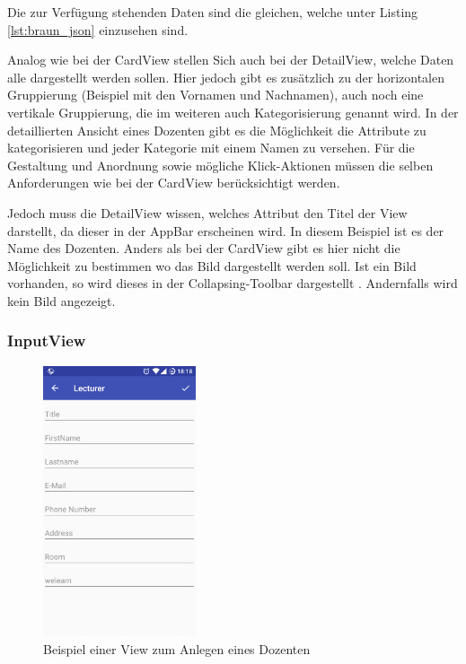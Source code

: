 Die zur Verfügung  stehenden Daten sind die gleichen, welche unter Listing \ref{lst:braun_json} einzusehen sind.

Analog wie bei der CardView stellen Sich auch bei der DetailView, welche Daten alle dargestellt werden sollen. Hier jedoch gibt es zusätzlich zu der horizontalen Gruppierung (Beispiel mit den Vornamen und Nachnamen), auch noch eine vertikale Gruppierung, die im weiteren auch Kategorisierung genannt wird. In der detaillierten Ansicht eines Dozenten gibt es die Möglichkeit die Attribute zu kategorisieren und jeder Kategorie mit einem Namen zu versehen. Für die Gestaltung und Anordnung sowie mögliche Klick-Aktionen müssen die selben Anforderungen wie bei der CardView berücksichtigt werden. 

Jedoch muss die DetailView wissen, welches Attribut den Titel der View darstellt, da dieser in der AppBar erscheinen wird. In diesem Beispiel ist es der Name des Dozenten. Anders als bei der CardView gibt es hier nicht die Möglichkeit zu bestimmen wo das Bild dargestellt werden soll. Ist ein Bild vorhanden, so wird dieses in der Collapsing-Toolbar dargestellt \cite{collapsing}. Andernfalls wird kein Bild angezeigt.

\subsubsection{InputView}

\begin{figure}[H]
	\begin{center}
		\includegraphics[width=0.4\textwidth]{images/input.png}
		\caption{Beispiel einer View zum Anlegen eines Dozenten}
		\label{fig:input}
	\end{center}
\end{figure}

